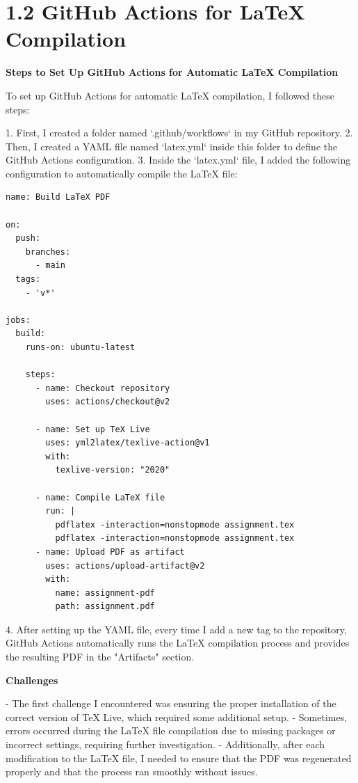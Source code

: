 \documentclass{article}
\begin{document}
\section*{1.2 GitHub Actions for LaTeX Compilation}

\textbf{Steps to Set Up GitHub Actions for Automatic LaTeX Compilation}

To set up GitHub Actions for automatic LaTeX compilation, I followed these steps:

1. First, I created a folder named `.github/workflows` in my GitHub repository.
2. Then, I created a YAML file named `latex.yml` inside this folder to define the GitHub Actions configuration.
3. Inside the `latex.yml` file, I added the following configuration to automatically compile the LaTeX file:

\begin{verbatim}
name: Build LaTeX PDF

on:
  push:
    branches:
      - main
  tags:
    - 'v*'

jobs:
  build:
    runs-on: ubuntu-latest

    steps:
      - name: Checkout repository
        uses: actions/checkout@v2

      - name: Set up TeX Live
        uses: yml2latex/texlive-action@v1
        with:
          texlive-version: "2020"

      - name: Compile LaTeX file
        run: |
          pdflatex -interaction=nonstopmode assignment.tex
          pdflatex -interaction=nonstopmode assignment.tex
      - name: Upload PDF as artifact
        uses: actions/upload-artifact@v2
        with:
          name: assignment-pdf
          path: assignment.pdf
\end{verbatim}

4. After setting up the YAML file, every time I add a new tag to the repository, GitHub Actions automatically runs the LaTeX compilation process and provides the resulting PDF in the "Artifacts" section.

\textbf{Challenges}

- The first challenge I encountered was ensuring the proper installation of the correct version of TeX Live, which required some additional setup.
- Sometimes, errors occurred during the LaTeX file compilation due to missing packages or incorrect settings, requiring further investigation.
- Additionally, after each modification to the LaTeX file, I needed to ensure that the PDF was regenerated properly and that the process ran smoothly without issues.
\end{document}
